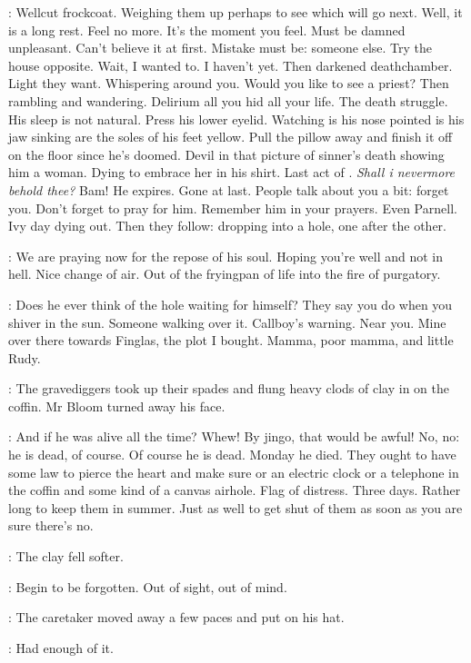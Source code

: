 \BloomInt:
Wellcut frockcoat.
Weighing them up perhaps to see which will go next.
Well, it is a long rest.
Feel no more.
It's the moment you feel.
Must be damned unpleasant.
Can't believe it at first.
Mistake must be:
someone else.
Try the house opposite.
Wait, I wanted to.
I haven't yet.
Then darkened deathchamber.
Light they want.
Whispering around you.
Would you like to see a priest?
Then rambling and wandering.
Delirium all you hid all your life.
The death struggle.
His sleep is not natural.
Press his lower eyelid.
Watching
is his nose pointed
is his jaw sinking
are the soles of his feet yellow.
Pull the pillow away and finish it off on the floor
since he's doomed.
Devil in that picture of sinner's death
showing him a woman.
Dying to embrace her in his shirt.
Last act of .
\emph{Shall i nevermore behold thee?}
Bam!
He expires.
Gone at last.
People talk about you a bit:
forget you.
Don't forget to pray for him.
Remember him in your prayers.
Even Parnell.
Ivy day dying out.
Then they follow:
dropping into a hole, one after the other.

\BloomInt:
We are praying now for the repose of his soul.
Hoping you're well and not in hell.
Nice change of air.
Out of the fryingpan of life into the fire of purgatory.

\BloomInt:
Does he ever think of the hole waiting for himself?
They say you do when you shiver in the sun.
Someone walking over it.
Callboy's warning.
Near you.
Mine over there towards Finglas, the plot I bought.
Mamma, poor mamma, and little Rudy.

:
The gravediggers took up their spades
and flung heavy clods of clay in on the coffin.
Mr Bloom turned away his face.

\BloomInt:
And if he was alive all the time?
Whew!
By jingo, that would be awful!
No, no:
he is dead, of course.
Of course he is dead.
Monday he died.
They ought to have some law to pierce the heart and make sure
or an electric clock or a telephone in the coffin
and some kind of a canvas airhole.
Flag of distress.
Three days.
Rather long to keep them in summer.
Just as well to get shut of them as soon as you are sure there's no.

:
The clay fell softer.

\BloomInt:
Begin to be forgotten.
Out of sight, out of mind.

:
The caretaker moved away a few paces and put on his hat.

\BloomInt:
Had enough of it.

